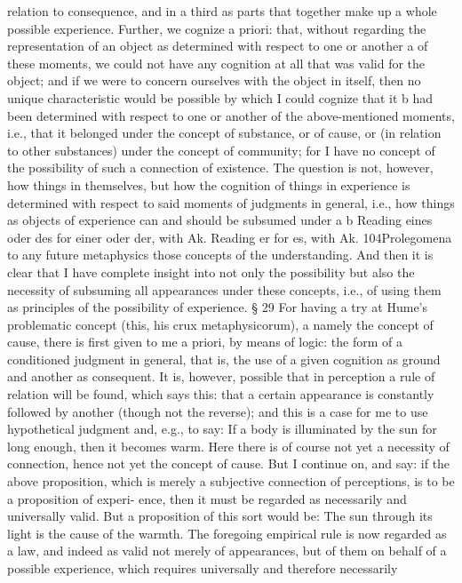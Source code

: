 relation to consequence, and in a third as parts that together make up
a whole possible experience. Further, we cognize a priori: that, without
regarding the representation of an object as determined with respect to
one or another a of these moments, we could not have any cognition at
all that was valid for the object; and if we were to concern ourselves with
the object in itself, then no unique characteristic would be possible by
which I could cognize that it b had been determined with respect to one
or another of the above-mentioned moments, i.e., that it belonged under
the concept of substance, or of cause, or (in relation to other substances)
under the concept of community; for I have no concept of the possibility
of such a connection of existence. The question is not, however, how
things in themselves, but how the cognition of things in experience is
determined with respect to said moments of judgments in general, i.e.,
how things as objects of experience can and should be subsumed under
a
b
Reading eines oder des for einer oder der, with Ak.
Reading er for es, with Ak.
104Prolegomena to any future metaphysics
those concepts of the understanding. And then it is clear that I have
complete insight into not only the possibility but also the necessity of
subsuming all appearances under these concepts, i.e., of using them as
principles of the possibility of experience.
§ 29
For having a try at Hume’s problematic concept (this, his crux
metaphysicorum), a namely the concept of cause, there is ﬁrst given to
me a priori, by means of logic: the form of a conditioned judgment in
general, that is, the use of a given cognition as ground and another as
consequent. It is, however, possible that in perception a rule of relation
will be found, which says this: that a certain appearance is constantly
followed by another (though not the reverse); and this is a case for me to
use hypothetical judgment and, e.g., to say: If a body is illuminated by
the sun for long enough, then it becomes warm. Here there is of course
not yet a necessity of connection, hence not yet the concept of cause.
But I continue on, and say: if the above proposition, which is merely a
subjective connection of perceptions, is to be a proposition of experi-
ence, then it must be regarded as necessarily and universally valid. But a
proposition of this sort would be: The sun through its light is the cause
of the warmth. The foregoing empirical rule is now regarded as a law,
and indeed as valid not merely of appearances, but of them on behalf of a
possible experience, which requires universally and therefore necessarily
